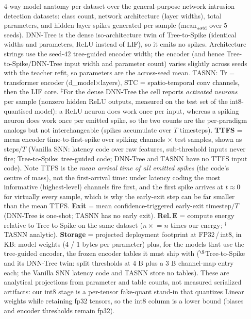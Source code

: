 \begin{table}[!ht]
\centering
\renewcommand{\arraystretch}{1.05}
\caption{4-way model anatomy per dataset over the general-purpose network intrusion detection datasets: class count, network architecture (layer widths), total parameters, and hidden-layer spikes generated per sample (mean$_{\pm\text{std}}$ over 5 seeds). DNN-Tree is the dense iso-architecture twin of Tree-to-Spike (identical widths and parameters, ReLU instead of LIF), so it emits no spikes. Architecture strings use the seed-42 tree-guided encoder width; the encoder (and hence Tree-to-Spike/DNN-Tree input width and parameter count) varies slightly across seeds with the teacher refit, so parameters are the across-seed mean. TASNN: Tr = transformer encoder (d\_model$\times$layers), STC = spatio-temporal conv channels, then the LIF core. $^\ddagger$For the dense DNN-Tree the cell reports \emph{activated neurons} per sample (nonzero hidden ReLU outputs, measured on the test set of the int8-quantised model): a ReLU neuron does work once per input, whereas a spiking neuron does work once per emitted spike, so the two counts are the per-paradigm analogs but not interchangeable (spikes accumulate over $T$ timesteps). \textbf{TTFS} = mean encoder time-to-first-spike over spiking channels $\times$ test samples, shown as steps$/T$ (Vanilla SNN: latency code over raw features, sub-threshold inputs never fire; Tree-to-Spike: tree-guided code; DNN-Tree and TASNN have no TTFS input code). Note TTFS is the \emph{mean arrival time of all emitted spikes} (the code's centre of mass), not the first-arrival time: under latency coding the most informative (highest-level) channels fire first, and the first spike arrives at $t \approx 0$ for virtually every sample, which is why the early-exit step can be far smaller than the mean TTFS. \textbf{Exit} = mean confidence-triggered early-exit timestep$/T$ (DNN-Tree is one-shot; TASNN has no early exit). \textbf{Rel.\,E} = compute energy relative to Tree-to-Spike on the same dataset ($n\times$ = $n$ times our energy; $^\dagger$TASNN analytic). \textbf{Storage} = projected deployment footprint at FP32\,/\,int8, in KB: model weights (4 / 1 bytes per parameter) plus, for the models that use the tree-guided encoder, the frozen encoder tables it must ship with ($^{\S}$Tree-to-Spike and its DNN-Tree twin: split thresholds at 4 B plus a 3 B channel-map entry each; the Vanilla SNN latency code and TASNN store no tables). These are analytical projections from parameter and table counts, not measured serialized artifacts: our int8 stage is a per-tensor fake-quant stand-in that quantizes Linear weights while retaining fp32 tensors, so the int8 column is a lower bound (biases and encoder thresholds remain fp32).}

\end{table}
